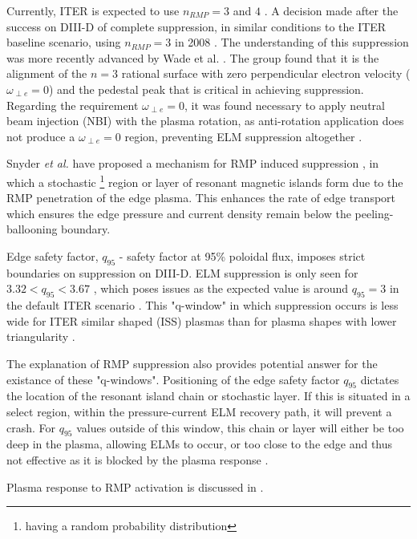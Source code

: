 \documentclass[12pt]{article}  %
\begin{document}
Currently, ITER is expected to use $n_{RMP} = 3$ and $4$ \cite{Chapman2014}. A decision made after the success on DIII-D of complete suppression, in similar conditions to the ITER baseline scenario, using $n_{RMP}=3$ in 2008 \cite{Evans2008, Fenstermacher2008}. The understanding of this suppression was more recently advanced by Wade et al. \cite{Wade2015}. The group found that it is the alignment of the $n=3$ rational surface with zero perpendicular electron velocity ($\omega_{\perp e} = 0$) and the pedestal peak that is critical in achieving suppression. Regarding the requirement $\omega_{\perp e} =0$, it was found necessary to apply neutral beam injection (NBI) with the plasma rotation, as anti-rotation application does not produce a $\omega_{\perp e} = 0$ region, preventing ELM suppression altogether \cite{Wade2015}.

Snyder \textit{et al.} have proposed a mechanism for RMP induced suppression \cite{Snyder2012}, in which a stochastic \footnote{having a random probability distribution} region or layer of resonant magnetic islands form due to the RMP penetration of the edge plasma. This enhances the rate of edge transport which ensures the edge pressure and current density remain below the peeling-ballooning boundary.

Edge safety factor, $q_{95}$ - safety factor at 95\% poloidal flux, imposes strict boundaries on suppression on DIII-D. ELM suppression is only seen for $3.32 < q_{95} < 3.67$ \cite{Fenstermacher2008}, which poses issues as the expected value is around $q_{95} = 3$ in the default ITER scenario \cite{Gormezano2007}. This "q-window" in which suppression occurs is less wide for ITER similar shaped (ISS) plasmas than for plasma shapes with lower triangularity \cite{Evans2008}. 

The explanation \cite{Snyder2012} of RMP suppression also provides potential answer for the existance of these "q-windows". Positioning of the edge safety factor $q_{95}$ dictates the location of the resonant island chain or stochastic layer. If this is situated in a select region, within the pressure-current ELM recovery path, it will prevent a crash. For $q_{95}$ values outside of this window, this chain or layer will either be too deep in the plasma, allowing ELMs to occur, or too close to the edge and thus not effective as it is blocked by the plasma response \cite{Snyder2012}.

Plasma response to RMP activation is discussed in \cite{Waelbroeck2009}.
\end{document}
